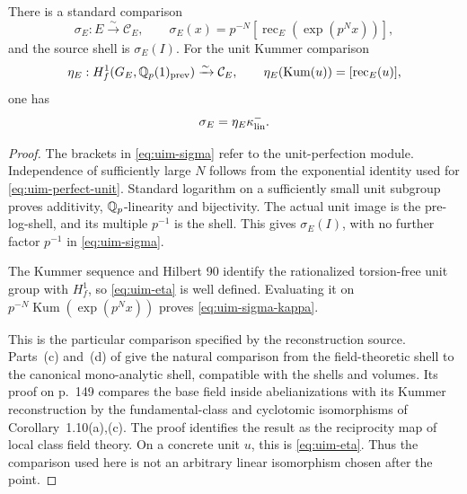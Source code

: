 \begin{proposition}
\label{prop:uim-core-coordinate}
There is a standard comparison
\begin{equation}\label{eq:uim-sigma}
 \sigma_E:E\xrightarrow{\sim}\mathcal C_E,\qquad
 \sigma_E(x)
     =p^{-N}[\operatorname{rec}_E(\exp(p^Nx))],
\end{equation}
and the source shell is \(\sigma_E(I)\).
For the unit Kummer comparison
\begin{equation}\label{eq:uim-eta}
 \eta_E:H^1_f(G_E,\mathbb Q_p(1)_{\rm prev})
          \xrightarrow{\sim}\mathcal C_E,\qquad
 \eta_E(\operatorname{Kum}(u))
          =[\operatorname{rec}_E(u)],
\end{equation}
one has
\begin{equation}\label{eq:uim-sigma-kappa}
                    \sigma_E=\eta_E\kappa^-_{\rm lin}.
\end{equation}
\end{proposition}
\begin{proof}
The brackets in \eqref{eq:uim-sigma} refer to
the unit-perfection module. Independence of
sufficiently large \(N\) follows from the
exponential identity used for
\eqref{eq:uim-perfect-unit}. Standard logarithm
on a sufficiently small unit subgroup proves
additivity, \(\mathbb Q_p\)-linearity and bijectivity.
The actual unit image is the pre-log-shell,
and its multiple \(p^{-1}\) is the shell.
This gives \(\sigma_E(I)\), with no further
factor \(p^{-1}\) in \eqref{eq:uim-sigma}.

The Kummer sequence and Hilbert 90 identify
the rationalized torsion-free unit group
with \(H^1_f\), so \eqref{eq:uim-eta} is
well defined. Evaluating it on
\(p^{-N}\operatorname{Kum}(\exp(p^Nx))\)
proves \eqref{eq:uim-sigma-kappa}.

This is the particular comparison specified
by the reconstruction source.
Parts~(c) and~(d) of
\cite[Corollary~5.10(iv), p.~148]{MochizukiAbsTopIII2015}
give the natural
comparison from the field-theoretic shell
to the canonical mono-analytic shell,
compatible with the shells and volumes.
Its proof on p.~149 compares the base field
inside abelianizations with its Kummer
reconstruction by the fundamental-class
and cyclotomic isomorphisms of
Corollary~1.10(a),(c). The proof identifies
the result as the reciprocity map of
local class field theory. On a concrete
unit \(u\), this is
\eqref{eq:uim-eta}. Thus the comparison
used here is not an arbitrary linear
isomorphism chosen after the point.
\end{proof}

